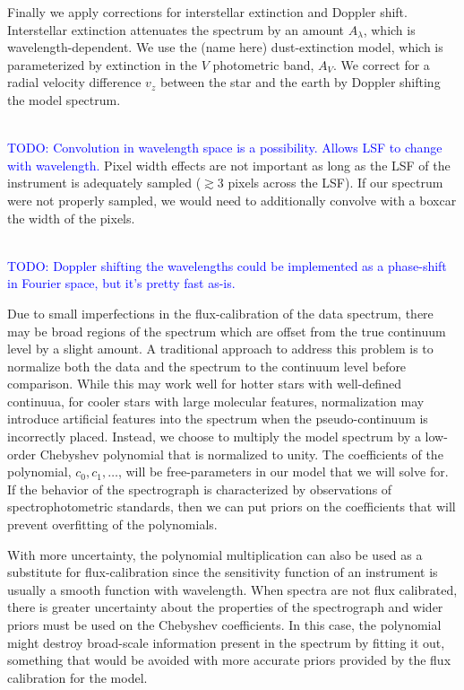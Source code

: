 \documentclass[iop,floatfix]{emulateapj}
\newcommand{\todo}[1]{ \textcolor{Blue}{\\TODO: #1}}
\begin{document}
Finally we apply corrections for interstellar extinction and Doppler shift. Interstellar extinction attenuates the spectrum by an amount $A_\lambda$, which is wavelength-dependent. We use the (name here) dust-extinction model, which is parameterized by extinction in the $V$ photometric band, $A_V$. We correct for a radial velocity difference $v_z$ between the star and the earth by Doppler shifting the model spectrum. 

\todo{Convolution in wavelength space is a possibility. Allows LSF to change with wavelength.}
Pixel width effects are not important as long as the LSF of the instrument is adequately sampled ($\gtrsim 3$ pixels across the LSF). If our spectrum were not properly sampled, we would need to additionally convolve with a boxcar the width of the pixels.

\todo{Doppler shifting the wavelengths could be implemented as a phase-shift in Fourier space, but it's pretty fast as-is.}

Due to small imperfections in the flux-calibration of the data spectrum, there may be broad regions of the spectrum which are offset from the true continuum level by a slight amount. A traditional approach to address this problem is to normalize both the data and the spectrum to the continuum level before comparison. While this may work well for hotter stars with well-defined continuua, for cooler stars with large molecular features, normalization may introduce artificial features into the spectrum when the pseudo-continuum is incorrectly placed. Instead, we choose to multiply the model spectrum by a low-order Chebyshev polynomial that is normalized to unity. The coefficients of the polynomial, $c_0, c_1, \ldots$, will be free-parameters in our model that we will solve for. If the behavior of the spectrograph is characterized by observations of spectrophotometric standards, then we can put priors on the coefficients that will prevent overfitting of the polynomials. 

With more uncertainty, the polynomial multiplication can also be used as a substitute for flux-calibration since the sensitivity function of an instrument is usually a smooth function with wavelength. When spectra are not flux calibrated, there is greater uncertainty about the properties of the spectrograph and wider priors must be used on the Chebyshev coefficients. In this case, the polynomial might destroy broad-scale information present in the spectrum by fitting it out, something that would be avoided with more accurate priors provided by the flux calibration for the model.
\end{document}
